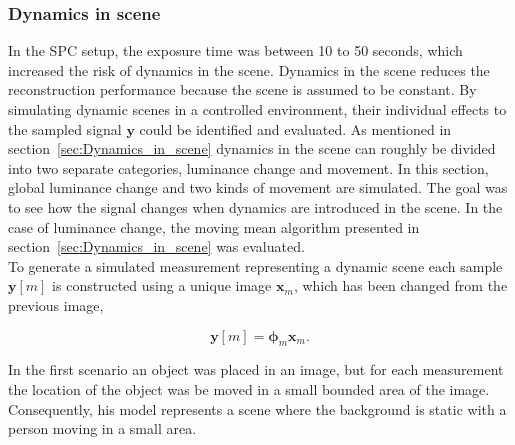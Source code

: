 \subsubsection{Dynamics in scene}
\label{sec:dyn_sim}
In the SPC setup, the exposure time was between 10 to 50 seconds, which increased the risk of dynamics in the scene. Dynamics in the scene reduces the reconstruction performance because the scene is assumed to be constant. By simulating dynamic scenes in a controlled environment, their individual effects to the sampled signal $\mathbf{y}$ could be identified and evaluated. As mentioned in section~\ref{sec:Dynamics_in_scene} dynamics in the scene can roughly be divided into two separate categories, luminance change and movement. In this section, global luminance change and two kinds of movement are simulated. The goal was to see how the signal changes when dynamics are introduced in the scene. In the case of luminance change, the moving mean algorithm presented in section~\ref{sec:Dynamics_in_scene} was evaluated.\\[0.1in]

To generate a simulated measurement representing a dynamic scene each sample $\mathbf{y}[m]$ is constructed using a unique image $\mathbf{x}_m$, which has been changed from the previous image,

\begin{equation}
\mathbf{y}[m] = \mathbf{\phi}_m\mathbf{x}_m.
\end{equation}

In the first scenario an object was placed in an image, but for each measurement the location of the object was be moved in a small bounded area of the image. Consequently, his model represents a scene where the background is static with a person moving in a small area.



